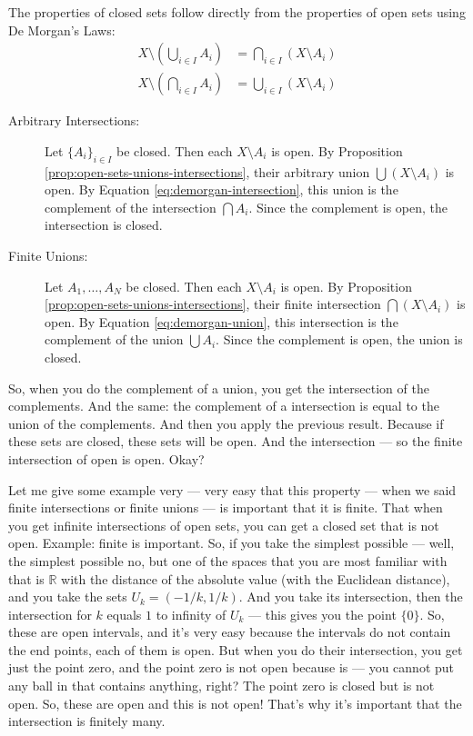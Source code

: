\begin{math-stroke}
The properties of closed sets follow directly from the properties of open sets using De Morgan's Laws:
\begin{align}
X \setminus \left( \bigcup_{i \in I} A_i \right) &= \bigcap_{i \in I} (X \setminus A_i) \label{eq:demorgan-union} \\
X \setminus \left( \bigcap_{i \in I} A_i \right) &= \bigcup_{i \in I} (X \setminus A_i) \label{eq:demorgan-intersection}
\end{align}
\begin{description}
    \item[Arbitrary Intersections:] Let $\{A_i\}_{i \in I}$ be closed. Then each $X \setminus A_i$ is open. By Proposition \ref{prop:open-sets-unions-intersections}, their arbitrary union $\bigcup (X \setminus A_i)$ is open. By Equation \ref{eq:demorgan-intersection}, this union is the complement of the intersection $\bigcap A_i$. Since the complement is open, the intersection is closed.
    \item[Finite Unions:] Let $A_1, \dots, A_N$ be closed. Then each $X \setminus A_i$ is open. By Proposition \ref{prop:open-sets-unions-intersections}, their finite intersection $\bigcap (X \setminus A_i)$ is open. By Equation \ref{eq:demorgan-union}, this intersection is the complement of the union $\bigcup A_i$. Since the complement is open, the union is closed.
\end{description}
\end{math-stroke}

\begin{spoken-clean}[00:21:42 - 00:24:23]
So, when you do the complement of a union, you get the intersection of the complements. And the same: the complement of a intersection is equal to the union of the complements. And then you apply the previous result. Because if these sets are closed, these sets will be open. And the intersection --- so the finite intersection of open is open. Okay?

Let me give some example very --- very easy that this property --- when we said finite intersections or finite unions --- is important that it is finite. That when you get infinite intersections of open sets, you can get a closed set that is not open. Example: finite is important. So, if you take the simplest possible --- well, the simplest possible no, but one of the spaces that you are most familiar with that is $\mathbb{R}$ with the distance of the absolute value (with the Euclidean distance), and you take the sets $U_k = (-1/k, 1/k)$. And you take its intersection, then the intersection for $k$ equals $1$ to infinity of $U_k$ --- this gives you the point $\{0\}$. So, these are open intervals, and it's very easy because the intervals do not contain the end points, each of them is open. But when you do their intersection, you get just the point zero, and the point zero is not open because is --- you cannot put any ball in that contains anything, right? The point zero is closed but is not open. So, these are open and this is not open! That's why it's important that the intersection is finitely many.
\end{spoken-clean}

